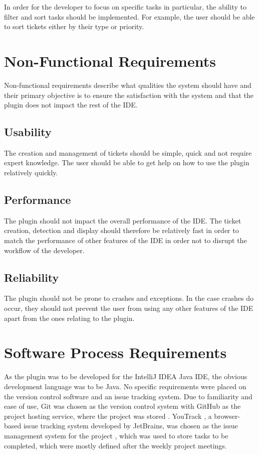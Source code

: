 \documentclass{4thYearProject}
\begin{document}
In order for the developer to focus on specific tasks in particular, the ability to filter and sort tasks should be implemented. For example, the user should be able to sort tickets either by their type or priority. 

\section{Non-Functional Requirements}

Non-functional requirements describe what qualities the system should have and their primary objective is to ensure the satisfaction with the system \cite{nonfunctional} and that the plugin does not impact the rest of the IDE.

\subsection{Usability}

The creation and management of tickets should be simple, quick and not require expert knowledge. The user should be able to get help on how to use the plugin relatively quickly.

\subsection{Performance}

The plugin should not impact the overall performance of the IDE. The ticket creation, detection and display should therefore be relatively fast in order to match the performance of other features of the IDE in order not to disrupt the workflow of the developer. 

\subsection{Reliability}

The plugin should not be prone to crashes and exceptions. In the case crashes do occur, they should not prevent the user from using any other features of the IDE apart from the ones relating to the plugin.  


\section{Software Process Requirements}

As the plugin was to be developed for the IntelliJ IDEA Java IDE, the obvious development language was to be Java. No specific requirements were placed on the version control software and an issue tracking system. Due to familiarity and ease of use, Git \cite{git} was chosen as the version control system with GitHub \cite{github} as the project hosting service, where the project was stored \cite{repo}. YouTrack \cite{youtrack}, a browser-based issue tracking system developed by JetBrains, was chosen as the issue management system for the project \cite{youtracklink}, which was used to store tasks to be completed, which were mostly defined after the weekly project meetings. 
\end{document}
